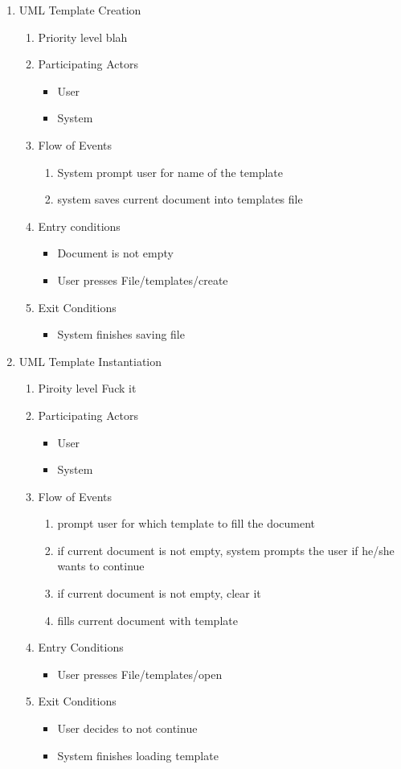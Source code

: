 \documentclass[a4paper, 12pt]{article}
\begin{document}
\begin{enumerate}
	\item UML Template Creation
	\begin {enumerate}
		\item Priority level blah
		\item Participating Actors
		\begin {itemize}
			\item User
			\item System
		\end {itemize}
		\item Flow of Events
		\begin {enumerate}
			\item System prompt user for name of the template
			\item system saves current document into templates file
		\end {enumerate}
		\item Entry conditions
		\begin {itemize}
			\item Document is not empty
			\item User presses File/templates/create
		\end {itemize}
		\item Exit Conditions
		\begin {itemize}
			\item System finishes saving file
		\end {itemize}
	\end {enumerate}
		
	\item UML Template Instantiation
	\begin {enumerate}
		\item Piroity level Fuck it
		\item Participating Actors
		\begin {itemize}
			\item User
			\item System
		\end {itemize}
		\item Flow of Events
		\begin {enumerate}
			\item prompt user for which template to fill the document
			\item if current document is not empty, system prompts the user if he/she wants to continue
			\item if current document is not empty, clear it
			\item fills current document with template
		\end {enumerate}
		\item Entry Conditions
		\begin{itemize}
			\item User presses File/templates/open
		\end {itemize}
		\item Exit Conditions
		\begin {itemize}
			\item User decides to not continue
			\item System finishes loading template
		\end {itemize}
	\end {enumerate}
\end {enumerate}
\end{document}
